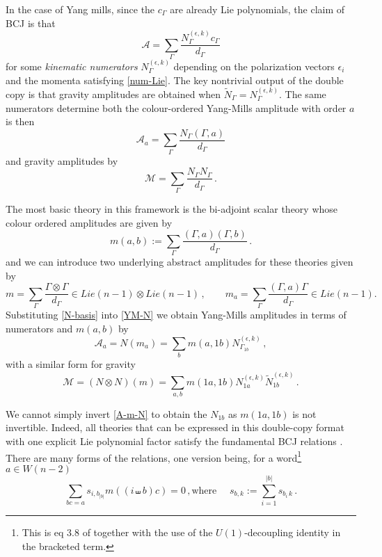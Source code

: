 \documentclass[11pt]{article}
\newcommand{\cA}{\mathcal{A}}
\newcommand{\cM}{\mathcal{M}}
\newcommand{\1}{{\rm 1\hskip-0.25em I}}
\begin{document}
In the case of Yang mills, since the $c_\Gamma$ are already Lie polynomials, the claim of BCJ \cite{Bern:2008qj} is that
\begin{equation}
\cA=\sum_\Gamma\frac{N_\Gamma^{(\epsilon,k)} c_\Gamma}{d_\Gamma}
\end{equation}
for some \emph{kinematic numerators} $N_\Gamma^{(\epsilon,k)}$ depending on the polarization vectors $\epsilon_i$ and the momenta satisfying \eqref{num-Lie}.  The key nontrivial output of the double copy is that gravity amplitudes are obtained  when $\tilde N_\Gamma=N_\Gamma^{(\epsilon,k)}$. The same numerators determine both 
the colour-ordered Yang-Mills amplitude with order $a$ is then
\begin{equation}
\cA_a = \sum_\Gamma \frac{N_\Gamma (\Gamma,a)}{d_\Gamma }\label{YM-N}
\end{equation}
and gravity amplitudes by
\begin{equation}
\cM = \sum_\Gamma \frac{N_\Gamma N_\Gamma}{d_\Gamma }\, .
\end{equation}



The most basic theory in this framework is the bi-adjoint scalar theory whose colour ordered amplitudes are given by
\begin{equation}
m(a,b):=\sum_\Gamma \frac{(\Gamma,a)(\Gamma,b)}{d_\Gamma}\, .
\end{equation}
and we can introduce two underlying abstract amplitudes for these theories given by
\begin{equation}
m=\sum_\Gamma \frac{\Gamma\otimes \Gamma}{d_\Gamma}\in Lie(n-1)\otimes Lie(n-1) \,, \qquad m_a=\sum_\Gamma\frac{(\Gamma,a)\Gamma}{d_\Gamma}\in Lie(n-1) .
\end{equation}
Substituting \eqref{N-basis} into \eqref{YM-N} we obtain Yang-Mills amplitudes in terms of numerators and $m(a,b)$ by
\begin{equation}
\cA_a=N(m_a)=\sum_b m(a,1b) N_{\Gamma_{1b}}^{(\epsilon,k)}\, ,\label{A-m-N}
\end{equation}
with a similar form for gravity
\begin{equation}
\cM=(N\otimes N)(m) =\sum_{a,b} m(1a,1b)N_{1a}^{(\epsilon,k)}\tilde N_{1b}^{(\epsilon,k)}\,.
\end{equation} 



We cannot simply invert \eqref{A-m-N} to obtain the $N_{1b}$ as $m(1a,1b)$ is not invertible. Indeed, 
all theories that can be expressed in this double-copy format with one explicit Lie polynomial factor satisfy the fundamental BCJ relations \cite{Bern:2008qj}.  There are many forms of the relations,  one version being, for a word\footnote{This is eq 3.8 of \cite{Cachazo:2012} together with the use of the $U(1)$-decoupling identity in the bracketed term.} $a\in W(n-2)$
\begin{equation}
\sum_{bc=a} s_{i,b_{|b|}} m((i\shuffle b)c)  =0\, ,
\mbox{where } \quad s_{b, k}:=\sum_{i=1}^{|b|} s_{b_i\, k}\, .
\end{equation}
\end{document}
